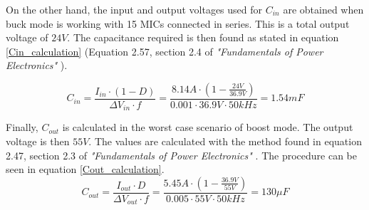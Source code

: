 On the other hand, the input and output voltages used for $C_{in}$ are obtained when buck mode is working with 15 MICs connected in series. This is a total output voltage of $24 V$.
The capacitance required is then found as stated in equation \ref{Cin_calculation} (Equation 2.57, section 2.4 of \textit{"Fundamentals of Power Electronics"} \cite{Erickson}).

\begin{equation} \label{Cin_calculation}
C_{in} = \frac{I_{in} \cdot (1 - D)}{\Delta V_{in} \cdot f} = \frac{8.14 A \cdot ( 1 - \frac{24 V}{36.9 V})}{0.001 \cdot 36.9 V \cdot 50 kHz} = 1.54 mF
\end{equation}

Finally, $C_{out}$ is calculated in the worst case scenario of boost mode. The output voltage is then $55V$. The values are calculated with the method found in equation 2.47, section 2.3 of \textit{"Fundamentals of Power Electronics"} \cite{Erickson}. The procedure can be seen in equation \ref{Cout_calculation}.
\begin{equation} \label{Cout_calculation}
C_{out} = \frac{I_{out} \cdot D}{\Delta V_{out} \cdot f} = \frac{5.45 A \cdot ( 1 - \frac{36.9 V}{55 V})}{0.005 \cdot 55 V \cdot 50 kHz} = 130 \mu F
\end{equation}

   
